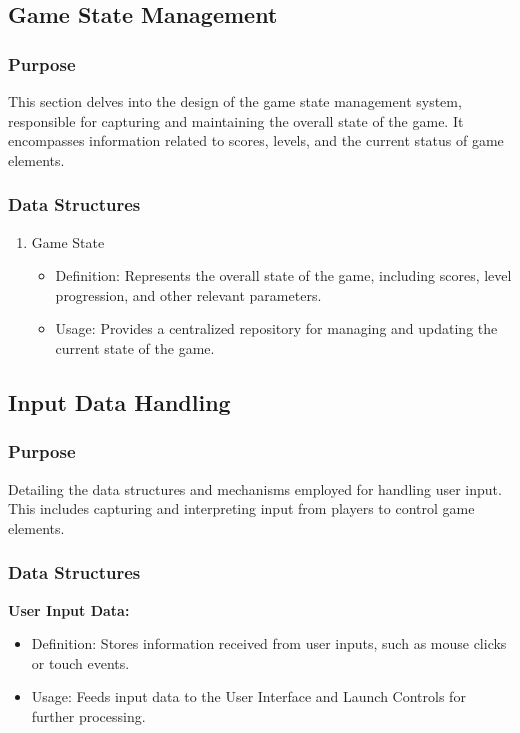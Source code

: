 \documentclass[12pt, titlepage]{article}
\begin{document}
\subsection{Game State Management}
\subsubsection{Purpose}
This section delves into the design of the game state management system, responsible for capturing and maintaining the overall state of the game. It encompasses information related to scores, levels, and the current status of game elements.
\subsubsection{Data Structures}
\begin{enumerate}
    \item Game State
        \begin{itemize}
            \item Definition: Represents the overall state of the game, including scores, level progression, and other relevant parameters.
            \item Usage: Provides a centralized repository for managing and updating the current state of the game.
        \end{itemize}
\end{enumerate}

\subsection{Input Data Handling}
\subsubsection{Purpose}
	Detailing the data structures and mechanisms employed for handling user input. This includes capturing and interpreting input from players to control game elements.
\subsubsection{Data Structures}
\textbf{User Input Data:}
    \begin{itemize}
        \item Definition: Stores information received from user inputs, such as mouse clicks or touch events.
        \item Usage: Feeds input data to the User Interface and Launch Controls for further processing.
    \end{itemize}
\end{document}
